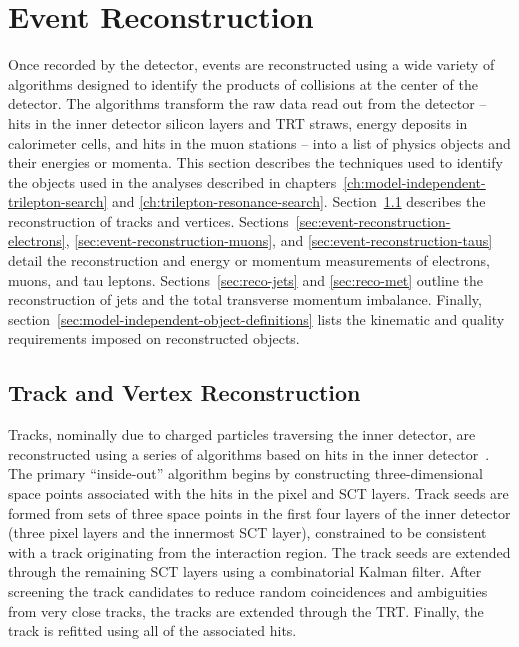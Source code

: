 \chapter{Event Reconstruction}\label{ch:event-reconstruction}

Once recorded by the detector, events are reconstructed using a wide variety of algorithms designed to identify the products of collisions at the center of the detector. The algorithms transform the raw data read out from the detector -- hits in the inner detector silicon layers and TRT straws, energy deposits in calorimeter cells, and hits in the muon stations -- into a list of physics objects and their energies or momenta. This section describes the techniques used to identify the objects used in the analyses described in chapters~\ref{ch:model-independent-trilepton-search} and \ref{ch:trilepton-resonance-search}. Section~\ref{sec:event-reconstruction-track-vertex} describes the reconstruction of tracks and vertices. Sections~\ref{sec:event-reconstruction-electrons}, \ref{sec:event-reconstruction-muons}, and \ref{sec:event-reconstruction-taus} detail the reconstruction and energy or momentum measurements of electrons, muons, and tau leptons. Sections~\ref{sec:reco-jets} and \ref{sec:reco-met} outline the reconstruction of jets and the total transverse momentum imbalance. Finally, section~\ref{sec:model-independent-object-definitions} lists the kinematic and quality requirements imposed on reconstructed objects. 


\section{Track and Vertex Reconstruction}\label{sec:event-reconstruction-track-vertex}
Tracks, nominally due to charged particles traversing the inner detector, are reconstructed using a series of algorithms based on hits in the inner detector~\cite{Cornelissen:2007vba,TheATLASCollaboration:2010vw,TheATLASCollaboration:2012tja}.
The primary ``inside-out'' algorithm begins by constructing three-dimensional space points associated with the hits in the pixel and SCT layers. Track seeds are formed from sets of three space points in the first four layers of the inner detector (three pixel layers and the innermost SCT layer), constrained to be consistent with a track originating from the interaction region. The track seeds are extended through the remaining SCT layers using a combinatorial Kalman filter. After screening the track candidates to reduce random coincidences and ambiguities from very close tracks, the tracks are extended through the TRT. Finally, the track is refitted using all of the associated hits. 

